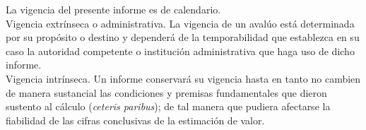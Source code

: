 La vigencia del presente informe es de \textcolor{terciario}{\vigenciaInforme{} calendario}.\\[5pt]

\noindent \textcolor{secundario}{Vigencia extr\'inseca o administrativa.} La vigencia de un aval\'uo est\'a determinada por su prop\'osito o destino y depender\'a de la temporabilidad que establezca en su caso la autoridad competente o instituci\'on administrativa que haga uso de dicho informe. \\[10pt]
\textcolor{secundario}{Vigencia intr\'inseca.} Un informe conservar\'a su vigencia hasta en tanto no cambien de manera sustancial las condiciones y premisas fundamentales que dieron sustento al c\'alculo (\textit{ceteris paribus}); de tal manera que pudiera afectarse la fiabilidad de las cifras conclusivas de la estimaci\'on de valor.